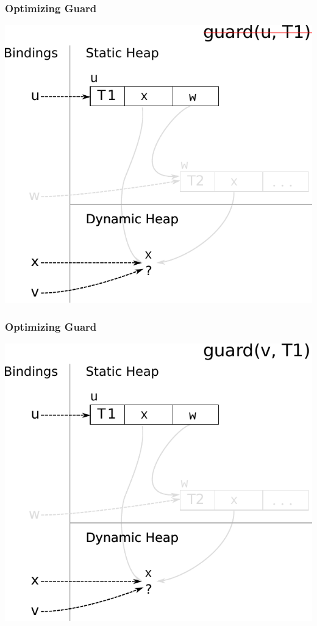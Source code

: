\documentclass[utf8x]{beamer}
\begin{document}
\begin{frame}[plain]
  \frametitle{Optimizing Guard}
  \includegraphics[scale=0.8]{figures/opt_guard2}
\end{frame}

\begin{frame}[plain]
  \frametitle{Optimizing Guard}
  \includegraphics[scale=0.8]{figures/opt_guard3}
\end{frame}
\end{document}
